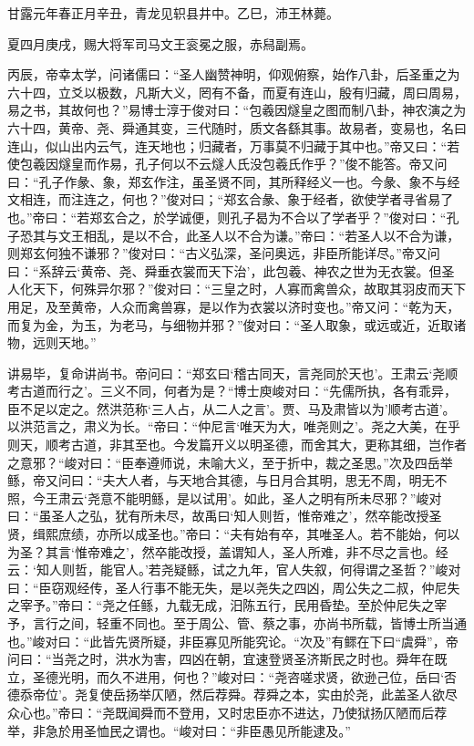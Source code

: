 \documentclass[12pt,UTF8]{ctexbook}
\begin{document}
甘露元年春正月辛丑，青龙见轵县井中。乙巳，沛王林薨。

夏四月庚戌，赐大将军司马文王衮冕之服，赤舄副焉。

丙辰，帝幸太学，问诸儒曰：“圣人幽赞神明，仰观俯察，始作八卦，后圣重之为六十四，立爻以极数，凡斯大义，罔有不备，而夏有连山，殷有归藏，周曰周易，易之书，其故何也？”易博士淳于俊对曰：“包羲因燧皇之图而制八卦，神农演之为六十四，黄帝、尧、舜通其变，三代随时，质文各繇其事。故易者，变易也，名曰连山，似山出内云气，连天地也；归藏者，万事莫不归藏于其中也。”帝又曰：“若使包羲因燧皇而作易，孔子何以不云燧人氏没包羲氏作乎？”俊不能答。帝又问曰：“孔子作彖、象，郑玄作注，虽圣贤不同，其所释经义一也。今彖、象不与经文相连，而注连之，何也？”俊对曰；“郑玄合彖、象于经者，欲使学者寻省易了也。”帝曰：“若郑玄合之，於学诚便，则孔子曷为不合以了学者乎？”俊对曰：“孔子恐其与文王相乱，是以不合，此圣人以不合为谦。”帝曰：“若圣人以不合为谦，则郑玄何独不谦邪？”俊对曰：“古义弘深，圣问奥远，非臣所能详尽。”帝又问曰：“系辞云‘黄帝、尧、舜垂衣裳而天下治’，此包羲、神农之世为无衣裳。但圣人化天下，何殊异尔邪？”俊对曰：“三皇之时，人寡而禽兽众，故取其羽皮而天下用足，及至黄帝，人众而禽兽寡，是以作为衣裳以济时变也。”帝又问：“乾为天，而复为金，为玉，为老马，与细物并邪？”俊对曰：“圣人取象，或远或近，近取诸物，远则天地。”

讲易毕，复命讲尚书。帝问曰：“郑玄曰‘稽古同天，言尧同於天也’。王肃云‘尧顺考古道而行之’。三义不同，何者为是？“博士庾峻对曰：“先儒所执，各有乖异，臣不足以定之。然洪范称‘三人占，从二人之言’。贾、马及肃皆以为'顺考古道’。以洪范言之，肃义为长。“帝曰：“仲尼言‘唯天为大，唯尧则之’。尧之大美，在乎则天，顺考古道，非其至也。今发篇开义以明圣德，而舍其大，更称其细，岂作者之意邪？“峻对曰：“臣奉遵师说，未喻大义，至于折中，裁之圣思。”次及四岳举鲧，帝又问曰：“夫大人者，与天地合其德，与日月合其明，思无不周，明无不照，今王肃云‘尧意不能明鲧，是以试用’。如此，圣人之明有所未尽邪？”峻对曰：“虽圣人之弘，犹有所未尽，故禹曰‘知人则哲，惟帝难之’，然卒能改授圣贤，缉熙庶绩，亦所以成圣也。”帝曰：“夫有始有卒，其唯圣人。若不能始，何以为圣？其言‘惟帝难之’，然卒能改授，盖谓知人，圣人所难，非不尽之言也。经云：‘知人则哲，能官人。’若尧疑鲧，试之九年，官人失叙，何得谓之圣哲？”峻对曰：“臣窃观经传，圣人行事不能无失，是以尧失之四凶，周公失之二叔，仲尼失之宰予。”帝曰：“尧之任鲧，九载无成，汨陈五行，民用昏垫。至於仲尼失之宰予，言行之间，轻重不同也。至于周公、管、蔡之事，亦尚书所载，皆博士所当通也。”峻对曰：“此皆先贤所疑，非臣寡见所能究论。“次及”有鳏在下曰“虞舜”，帝问曰：“当尧之时，洪水为害，四凶在朝，宜速登贤圣济斯民之时也。舜年在既立，圣德光明，而久不进用，何也？”峻对曰：“尧咨嗟求贤，欲逊己位，岳曰‘否德忝帝位’。尧复使岳扬举仄陋，然后荐舜。荐舜之本，实由於尧，此盖圣人欲尽众心也。”帝曰：“尧既闻舜而不登用，又时忠臣亦不进达，乃使狱扬仄陋而后荐举，非急於用圣恤民之谓也。“峻对曰：“非臣愚见所能逮及。”
\end{document}
